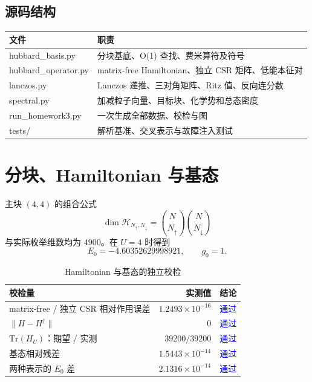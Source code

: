 \documentclass[UTF8,a4paper,11pt,fontset=windows]{ctexart}
\newcommand{\good}{\textcolor{blue}{通过}}
\begin{document}
\subsection{源码结构}
\begin{center}
\begin{tabularx}{0.94\textwidth}{@{}>{\ttfamily\small}p{3.7cm}X@{}}
\toprule
\textbf{文件} & \textbf{职责} \\
\midrule
hubbard\_basis.py & 分块基底、O(1) 查找、费米算符及符号 \\
hubbard\_operator.py & matrix-free Hamiltonian、独立 CSR 矩阵、低能本征对 \\
lanczos.py & Lanczos 递推、三对角矩阵、Ritz 值、反向连分数 \\
spectral.py & 加减粒子向量、目标块、化学势和总态密度 \\
run\_homework3.py & 一次生成全部数据、校检与图 \\
tests/ & 解析基准、交叉表示与故障注入测试 \\
\bottomrule
\end{tabularx}
\end{center}

\section{分块、Hamiltonian 与基态}

主块 $(4,4)$ 的组合公式
\begin{equation}
\dim\mathcal H_{N_\uparrow,N_\downarrow}
=\binom{N}{N_\uparrow}\binom{N}{N_\downarrow}
\end{equation}
与实际枚举维数均为 $4900$。在 $U=4$ 时得到
\begin{equation}
\boxed{E_0=-4.60352629998921},\qquad g_0=1.
\end{equation}

\begin{table}[H]
\centering
\caption{Hamiltonian 与基态的独立校检}
\begin{tabular}{p{8.2cm}rr}
\toprule
校检量 & 实测值 & 结论 \\
\midrule
matrix-free / 独立 CSR 相对作用误差 & $1.2493\times10^{-16}$ & \good \\
$\lVert H-H^\dagger\rVert$ & $0$ & \good \\
$\mathrm{Tr}(H_U)$：期望 / 实测 & $39200/39200$ & \good \\
基态相对残差 & $1.5443\times10^{-14}$ & \good \\
两种表示的 $E_0$ 差 & $2.1316\times10^{-14}$ & \good \\
\bottomrule
\end{tabular}
\end{table}
\end{document}
